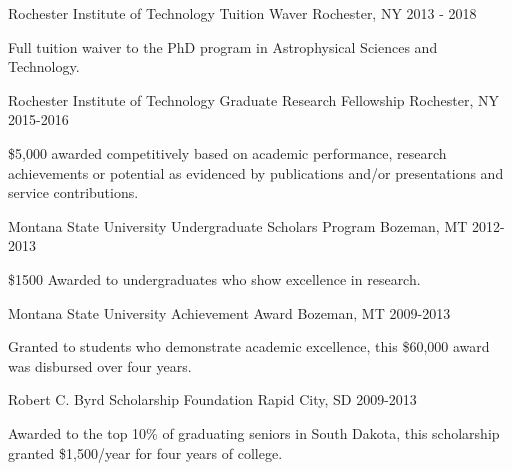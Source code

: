 \begin{cventries}
  \cventry
    {Rochester Institute of Technology}
    {Tuition Waver}
    {Rochester, NY}
    {2013 - 2018}
    {
    \begin{cvitems}
    	\item{Full tuition waiver to the PhD program in Astrophysical Sciences and Technology.}
    \end{cvitems}
    }
  
   \cventry
    {Rochester Institute of Technology}
    {Graduate Research Fellowship}
    {Rochester, NY}
    {2015-2016}
    {
    \begin{cvitems}
    	\item{\$5,000 awarded competitively based on academic performance, research achievements or potential
	 as evidenced by publications and/or presentations and service contributions.}
    \end{cvitems}
    }
    
    \cventry
    {Montana State University}
    {Undergraduate Scholars Program}
    {Bozeman, MT}
    {2012-2013}
     {
    \begin{cvitems}
    	\item{\$1500 Awarded to undergraduates who show excellence in research.}
    \end{cvitems}
    }
    
    \cventry
    {Montana State University}
    {Achievement Award}
    {Bozeman, MT}
    {2009-2013}
     {
    \begin{cvitems}
    	\item{Granted to students who demonstrate academic excellence, this \$60,000 award was disbursed over four years.}
    \end{cvitems}
    }
        
     \cventry
    {}
    {Robert C. Byrd Scholarship Foundation}
    {Rapid City, SD}
    {2009-2013}
     {
    \begin{cvitems}
    	\item{Awarded to the top 10\% of graduating seniors in South Dakota, this scholarship granted \$1,500/year for four years of college.}
    \end{cvitems}
    }




\end{cventries}
